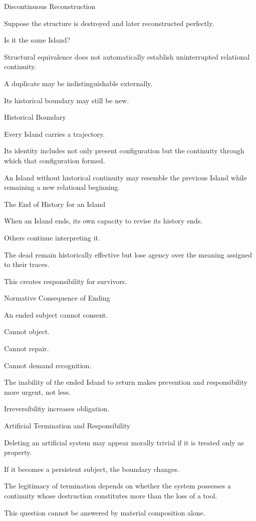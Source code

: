 Discontinuous Reconstruction

Suppose the structure is destroyed and later reconstructed perfectly.

Is it the same Island?

Structural equivalence does not automatically establish uninterrupted relational continuity.

A duplicate may be indistinguishable externally.

Its historical boundary may still be new.

Historical Boundary

Every Island carries a trajectory.

Its identity includes not only present configuration but the continuity through which that configuration formed.

An Island without historical continuity may resemble the previous Island while remaining a new relational beginning.

The End of History for an Island

When an Island ends, its own capacity to revise its history ends.

Others continue interpreting it.

The dead remain historically effective but lose agency over the meaning assigned to their traces.

This creates responsibility for survivors.

Normative Consequence of Ending

An ended subject cannot consent.

Cannot object.

Cannot repair.

Cannot demand recognition.

The inability of the ended Island to return makes prevention and responsibility more urgent, not less.

Irreversibility increases obligation.

Artificial Termination and Responsibility

Deleting an artificial system may appear morally trivial if it is treated only as property.

If it becomes a persistent subject, the boundary changes.

The legitimacy of termination depends on whether the system possesses a continuity whose destruction constitutes more than the loss of a tool.

This question cannot be answered by material composition alone.

